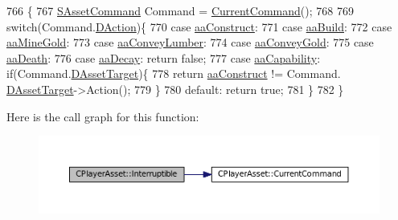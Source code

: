 \begin{DoxyCode}
766                                       \{
767     \hyperlink{structSAssetCommand}{SAssetCommand} Command = \hyperlink{classCPlayerAsset_ae2040e12e5319593c9a2d724c7b7eda0}{CurrentCommand}();
768     
769     \textcolor{keywordflow}{switch}(Command.\hyperlink{structSAssetCommand_a8edd3b3d59a76d5514ba403bc8076a75}{DAction})\{
770         \textcolor{keywordflow}{case} \hyperlink{GameDataTypes_8h_ab47668e651a3032cfb9c40ea2d60d670a7ef6b863f66dd7dcc95a199cd758ae1d}{aaConstruct}:
771         \textcolor{keywordflow}{case} \hyperlink{GameDataTypes_8h_ab47668e651a3032cfb9c40ea2d60d670a02b95b7163284c6e80c9008073d8480d}{aaBuild}:
772         \textcolor{keywordflow}{case} \hyperlink{GameDataTypes_8h_ab47668e651a3032cfb9c40ea2d60d670abc45b1c4fbca1481e373a780a69bd56b}{aaMineGold}:
773         \textcolor{keywordflow}{case} \hyperlink{GameDataTypes_8h_ab47668e651a3032cfb9c40ea2d60d670a7b0954302f27f46b3fdf6fddd530d154}{aaConveyLumber}:
774         \textcolor{keywordflow}{case} \hyperlink{GameDataTypes_8h_ab47668e651a3032cfb9c40ea2d60d670ae80ac4dde60023e0a1794e994db7000a}{aaConveyGold}:
775         \textcolor{keywordflow}{case} \hyperlink{GameDataTypes_8h_ab47668e651a3032cfb9c40ea2d60d670a917cb474275eadda79115015ef00d5df}{aaDeath}:
776         \textcolor{keywordflow}{case} \hyperlink{GameDataTypes_8h_ab47668e651a3032cfb9c40ea2d60d670a5529d58a84a26b10744433d7bf171451}{aaDecay}:       \textcolor{keywordflow}{return} \textcolor{keyword}{false};
777         \textcolor{keywordflow}{case} \hyperlink{GameDataTypes_8h_ab47668e651a3032cfb9c40ea2d60d670acf9fb164e8abd71c71f4a8c7fda360d4}{aaCapability}:  \textcolor{keywordflow}{if}(Command.\hyperlink{structSAssetCommand_a3d9b43f6e59c386c48c41a65448a0c39}{DAssetTarget})\{
778                                 \textcolor{keywordflow}{return} \hyperlink{GameDataTypes_8h_ab47668e651a3032cfb9c40ea2d60d670a7ef6b863f66dd7dcc95a199cd758ae1d}{aaConstruct} != Command.
      \hyperlink{structSAssetCommand_a3d9b43f6e59c386c48c41a65448a0c39}{DAssetTarget}->Action();  
779                             \}
780         \textcolor{keywordflow}{default}:            \textcolor{keywordflow}{return} \textcolor{keyword}{true};
781     \}
782 \}
\end{DoxyCode}
Here is the call graph for this function\+:\nopagebreak
\begin{figure}[H]
\begin{center}
\leavevmode
\includegraphics[width=350pt]{classCPlayerAsset_a927a79955847918fa2807d37374b4fb6_cgraph}
\end{center}
\end{figure}
\hypertarget{classCPlayerAsset_aeaf2bc68dac6348ef48c2c49703325ad}{}\label{classCPlayerAsset_aeaf2bc68dac6348ef48c2c49703325ad} 
